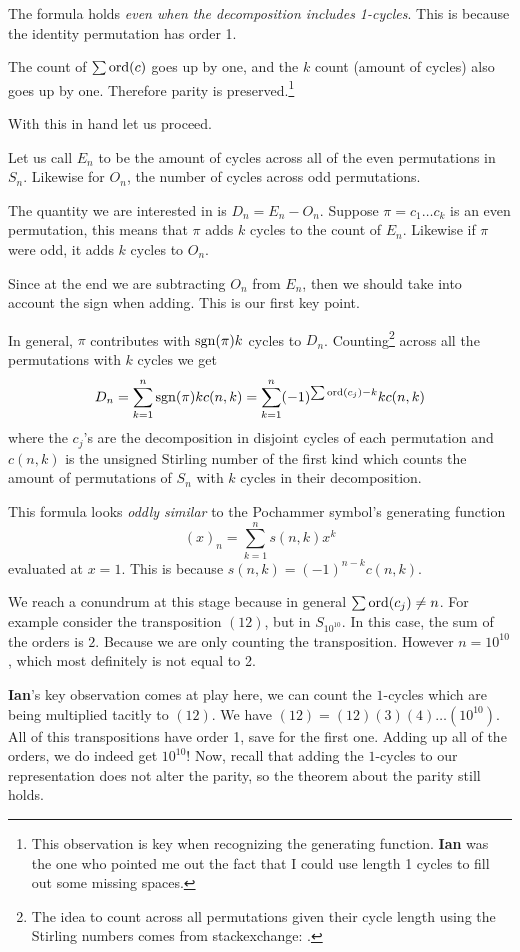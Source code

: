 \documentclass[12pt]{memoir}
\begin{document}
\begin{Rmk}
The formula holds \emph{even when the decomposition includes 1-cycles}. This is because the identity permutation has order 1.\par 
The count of $\sum\operatorname{ord}(c)$ goes up by one, and the $k$ count (amount of cycles) also goes up by one. Therefore parity is preserved.\footnote{This observation is key when recognizing the generating function. \textbf{Ian} was the one who pointed me out the fact that I could use length 1 cycles to fill out some missing spaces.}
\end{Rmk}

With this in hand let us proceed.

\begin{ptcbr}
Let us call $E_n$ to be the amount of cycles across all of the even permutations in $S_n$. Likewise for $O_n$, the number of cycles across odd permutations.\par 
The quantity we are interested in is $D_n=E_n-O_n$. Suppose $\pi=c_1\dots c_k$ is an even permutation, this means that $\pi$ adds $k$ cycles to the count of $E_n$. Likewise if $\pi$ were odd, it adds $k$ cycles to $O_n$.\par 
Since at the end we are subtracting $O_n$ from $E_n$, then we should take into account the sign when adding. This is our first key point.\par 
In general, $\pi$ contributes with $\operatorname{sgn}(\pi)k$ cycles to $D_n$. Counting\footnote{The idea to count across all permutations given their cycle length using the Stirling numbers comes from stackexchange: .} across all the permutations with $k$ cycles we get 
$$D_n=\sum_{k=1}^n\operatorname{sgn}(\pi)kc(n,k)=\sum_{k=1}^n(-1)^{\sum\operatorname{ord}(c_j)-k}kc(n,k)$$
where the $c_j$'s are the decomposition in disjoint cycles of each permutation and $c(n,k)$ is the unsigned Stirling number of the first kind which counts the amount of permutations of $S_n$ with $k$ cycles in their decomposition.\par 
This formula looks \emph{oddly similar} to the Pochammer symbol's generating function 
$$(x)_n=\sum_{k=1}^ns(n,k)x^k$$
evaluated at $x=1$. This is because $s(n,k)=(-1)^{n-k}c(n,k)$.
\end{ptcbr}

We reach a conundrum at this stage because in general $\sum\operatorname{ord}(c_j)\neq n$. For example consider the transposition $(12)$, but in $S_{10^{10}}$. In this case, the sum of the orders is $2$. Because we are only counting the transposition. However $n=10^{10}$, which most definitely is not equal to 2.\par 
\textbf{Ian}'s key observation comes at play here, we can count the $1$-cycles which are being multiplied tacitly to $(12)$. We have $(12)=(12)(3)(4)\dots(10^{10})$. All of this transpositions have order 1, save for the first one. Adding up all of the orders, we do indeed get $10^{10}$! Now, recall that adding the $1$-cycles to our representation does not alter the parity, so the theorem about the parity still holds. 
\end{document}
